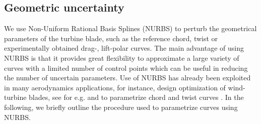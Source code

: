 \documentclass[review]{elsarticle}
\numberwithin{equation}{section}
\numberwithin{equation}{section}
\begin{document}
\subsection{Geometric uncertainty}
We use Non-Uniform Rational Basis Splines (NURBS) \cite{rogers2000} to perturb the geometrical parameters of the turbine blade, such as the reference chord, twist or experimentally obtained drag-, lift-polar curves. The main advantage of using NURBS is that it provides great flexibility to approximate a large variety of curves with a limited number of control points which can be useful in reducing the number of uncertain parameters. %
Use of NURBS has already been exploited in many aerodynamics applications, for instance, design optimization of wind-turbine blades, see for e.g. \cite{Bottasso2014,Ribeiro2012} and to parametrize chord and twist curves \cite{Echeverria2017}. In the following, we briefly outline the procedure used to parametrize curves using NURBS.
\end{document}
